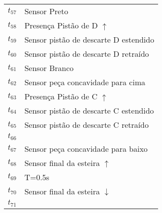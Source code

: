\begin{table}[htbp]
\begin{tabular}{ll}
\hyperlink{partialNet:t57}{\hypertarget{partialTable:t57}{$t_{57}$}} & Sensor Preto\\
\hyperlink{partialNet:t58}{\hypertarget{partialTable:t58}{$t_{58}$}} & Presença Pistão de D \(\uparrow\)\\
\hyperlink{partialNet:t59}{\hypertarget{partialTable:t59}{$t_{59}$}} & Sensor pistão de descarte D estendido\\
\hyperlink{partialNet:t60}{\hypertarget{partialTable:t60}{$t_{60}$}} & Sensor pistão de descarte D retraído\\
\hyperlink{partialNet:t61}{\hypertarget{partialTable:t61}{$t_{61}$}} & Sensor Branco\\
\hyperlink{partialNet:t62}{\hypertarget{partialTable:t62}{$t_{62}$}} & Sensor peça concavidade para cima\\
\hyperlink{partialNet:t63}{\hypertarget{partialTable:t63}{$t_{63}$}} & Presença Pistão de C \(\uparrow\)\\
\hyperlink{partialNet:t64}{\hypertarget{partialTable:t64}{$t_{64}$}} & Sensor pistão de descarte C estendido\\
\hyperlink{partialNet:t65}{\hypertarget{partialTable:t65}{$t_{65}$}} & Sensor pistão de descarte C retraído\\
\hyperlink{partialNet:t66}{\hypertarget{partialTable:t66}{$t_{66}$}} & \\
\hyperlink{partialNet:t67}{\hypertarget{partialTable:t67}{$t_{67}$}} & Sensor peça concavidade para baixo\\
\hyperlink{partialNet:t68}{\hypertarget{partialTable:t68}{$t_{68}$}} & Sensor final da esteira \(\uparrow\)\\
\hyperlink{partialNet:tt69}{\hypertarget{partialTable:tt69}{$t_{69}$}} & T=0.5s\\
\hyperlink{partialNet:t70}{\hypertarget{partialTable:t70}{$t_{70}$}} & Sensor final da esteira \(\downarrow\)\\
\hyperlink{partialNet:t71}{\hypertarget{partialTable:t71}{$t_{71}$}} & \\
\end{tabular}
\end{table}
